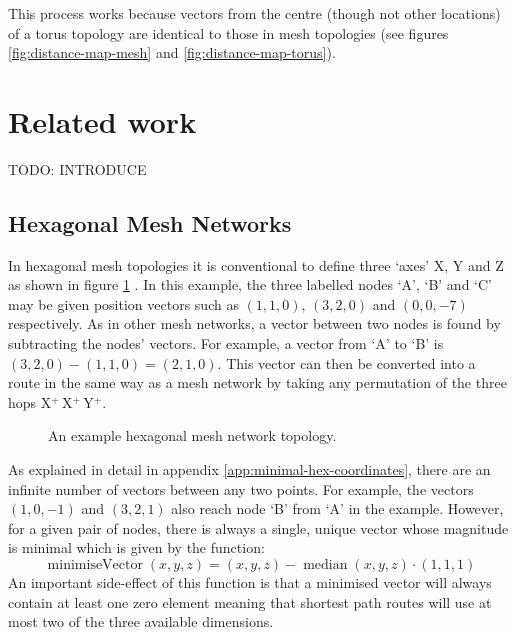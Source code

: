 			This process works because vectors from the centre (though not other
			locations) of a torus topology are identical to those in mesh topologies
			(see figures \ref{fig:distance-map-mesh} and
			\ref{fig:distance-map-torus}).
		
	\section{Related work}
		
		TODO: INTRODUCE
		
		\subsection{Hexagonal Mesh Networks}
			
			In hexagonal mesh topologies it is conventional to define three `axes' X,
			Y and Z as shown in figure \ref{fig:hex-mesh-topology-coordinates}
			\cite{patel15}. In this example, the three labelled nodes `A', `B' and
			`C' may be given position vectors such as $(1, 1, 0)$, $(3, 2, 0)$ and
			$(0, 0, -7)$ respectively. As in other mesh networks, a vector between
			two nodes is found by subtracting the nodes' vectors. For example, a
			vector from `A' to `B' is $(3, 2, 0) - (1, 1, 0) = (2, 1, 0)$. This
			vector can then be converted into a route in the same way as a mesh
			network by taking any permutation of the three hops  X$^+\,$X$^+\,$Y$^+$.
			
			\begin{figure}
				\center
				\caption{An example hexagonal mesh network topology.}
				\label{fig:hex-mesh-topology-coordinates}
			\end{figure}
			
			As explained in detail in appendix \ref{app:minimal-hex-coordinates},
			there are an infinite number of vectors between any two points. For
			example, the vectors $(1, 0, -1)$ and $(3, 2, 1)$ also reach node `B'
			from `A' in the example. However, for a given pair of nodes, there is
			always a single, unique vector whose magnitude is minimal which is
			given by the function:
			\begin{equation}
				\operatorname{minimiseVector}(x,y,z)
					= (x,y,z) - \operatorname{median}(x,y,z) \cdot (1,1,1)
			\end{equation}
			An important side-effect of this function is that a minimised vector will
			always contain at least one zero element meaning that shortest path
			routes will use at most two of the three available dimensions.
			
